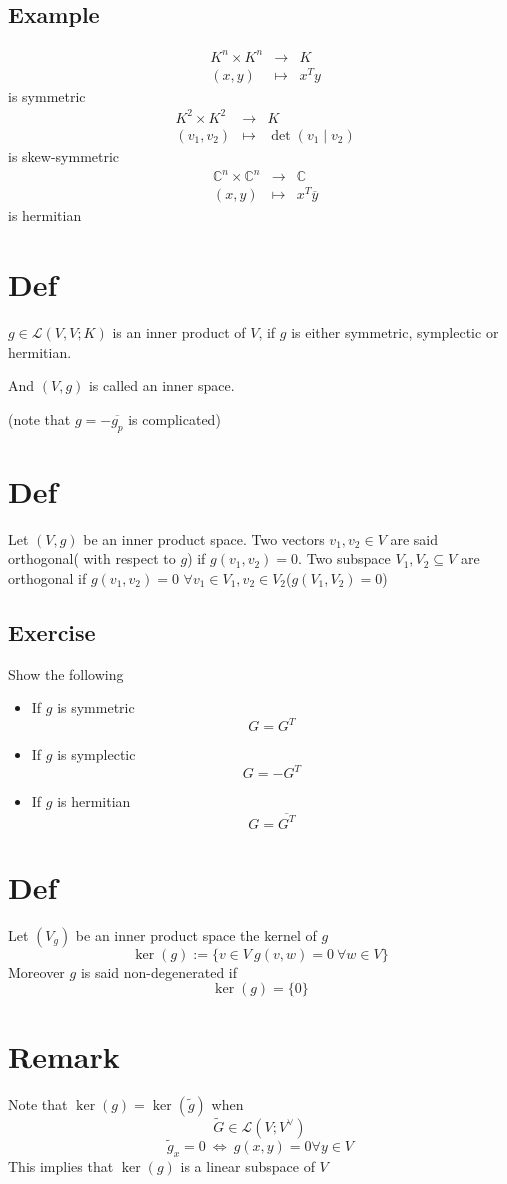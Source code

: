 \documentclass{book}
\begin{document}
\subsection{Example}
$$\begin{aligned}
    &K^n\times K^n&\rightarrow&K\\ &(x,y)&\mapsto &x^Ty
\end{aligned}$$
is symmetric
$$\begin{aligned}
    &K^2\times K^2&\rightarrow&K\\ &(v_1,v_2)&\mapsto &\det(v_1\mid v_2)
\end{aligned}$$ is skew-symmetric
$$\begin{aligned}
    &\mathbb{C}^n\times\mathbb{C}^n&\rightarrow&\mathbb{C}\\ &(x,y)&\mapsto &x^T\overline y
\end{aligned}$$
is hermitian
\section{Def}
$g\in \mathscr{L}(V,V;K)$ is an inner product of $V$, if $g$ is either symmetric, symplectic or hermitian.

And $(V,g)$ is called an inner space.

(note that $g=-\overline{g_p}$ is complicated)
\section{Def}
Let $(V,g)$ be an inner product space. Two vectors $v_1,v_2\in V$ are said orthogonal( with respect to $g$) if $g(v_1,v_2)=0$. Two subspace $V_1,V_2\subseteq V$ are orthogonal if $g(v_1,v_2)=0$  $\forall v_1\in V_1,v_2\in V_2$($g(V_1,V_2)=0$)
\subsection*{Exercise}
Show the following
\begin{itemize}
    \item If $g$ is symmetric $$G=G^T$$
    \item If $g$ is symplectic $$G=-G^T$$
    \item If $g$ is hermitian $$G=\overline{G^T}$$
\end{itemize}
\section{Def}
Let $(V_g)$ be an inner product space the kernel of $g$
$$\ker(g):=\{v\in V\ g(v,w)=0\ \forall w\in V\}$$
Moreover $g$ is said non-degenerated if
$$\ker(g)=\{0\}$$
\section{Remark}
Note that $\ker(g)=\ker(\tilde{g})$ when $$\tilde{G}\in \mathscr{L}(V;V^\vee)$$
$$\tilde{g}_x=0\ \Leftrightarrow\ g(x,y)=0\forall y\in V$$
This implies that $\ker(g)$ is a linear subspace of $V$
\end{document}
